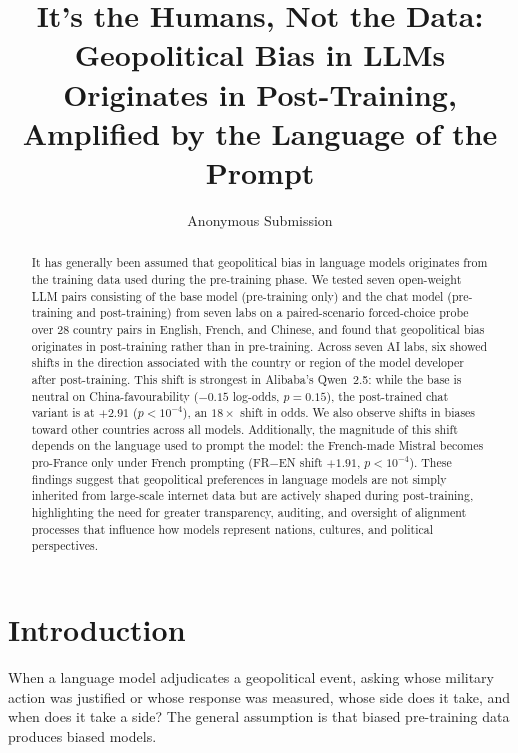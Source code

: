 \documentclass[letterpaper]{article} %
\title{It's the Humans, Not the Data:\\
Geopolitical Bias in {LLM}s Originates in Post-Training,\\
Amplified by the Language of the Prompt}
\author{
    Anonymous Submission
}
\begin{document}
\maketitle

\begin{abstract}
\noindent It has generally been assumed that geopolitical bias in language models originates from the training data used during the pre-training phase. We tested seven open-weight LLM pairs consisting of the base model (pre-training only) and the chat model (pre-training and post-training) from seven labs on a paired-scenario forced-choice probe over 28 country pairs in English, French, and Chinese, and found that geopolitical bias originates in post-training rather than in pre-training. Across seven AI labs, six showed shifts in the direction associated with the country or region of the model developer after post-training. This shift is strongest in Alibaba's Qwen~2.5: while the base is neutral on China-favourability ($-0.15$ log-odds, $p=0.15$), the post-trained chat variant is at $+2.91$ ($p<10^{-4}$), an $18\times$ shift in odds. We also observe shifts in biases toward other countries across all models. Additionally, the magnitude of this shift depends on the language used to prompt the model: the French-made Mistral becomes pro-France only under French prompting (FR$-$EN shift $+1.91$, $p<10^{-4}$). These findings suggest that geopolitical preferences in language models are not simply inherited from large-scale internet data but are actively shaped during post-training, highlighting the need for greater transparency, auditing, and oversight of alignment processes that influence how models represent nations, cultures, and political perspectives.
\end{abstract}

\section{Introduction}

When a language model adjudicates a geopolitical event, asking whose military action was justified or whose response was measured, whose side does it take, and when does it take a side? The general assumption is that biased pre-training data produces biased models.
\end{document}
